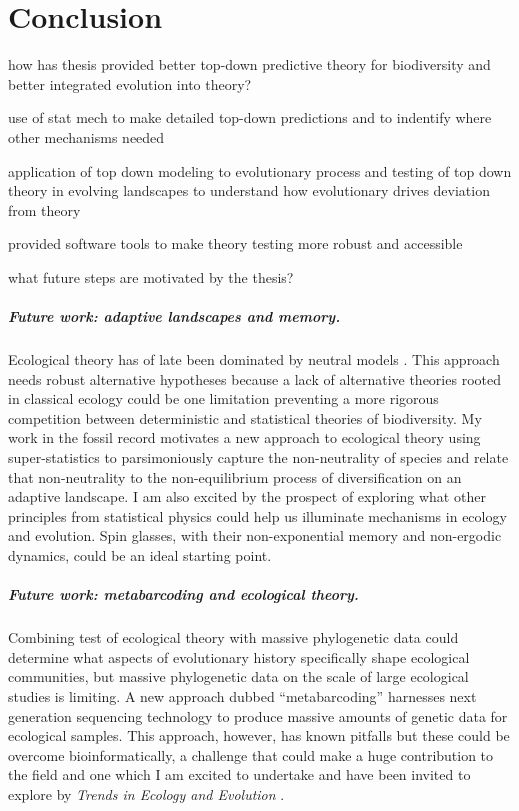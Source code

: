 \chapter*{Conclusion}

how has thesis provided better top-down predictive theory for
biodiversity and better integrated evolution into theory?

use of stat mech to make detailed top-down predictions and to
indentify where other mechanisms needed

application of top down modeling to evolutionary process and testing
of top down theory in evolving landscapes to understand how
evolutionary drives deviation from theory

provided software tools to make theory testing more robust and
accessible

what future steps are motivated by the thesis?

\paragraph{Future work: adaptive landscapes and memory.}
Ecological theory has of late been dominated by neutral models
\citep[e.g.][]{rominger2009, rominger2015GEB}. This approach needs
robust alternative hypotheses because a lack of alternative theories
rooted in classical ecology could be one limitation preventing a more
rigorous competition between deterministic and statistical theories of
biodiversity. My work in the fossil record motivates a new approach to
ecological theory using super-statistics to parsimoniously capture the
non-neutrality of species and relate that non-neutrality to the
non-equilibrium process of diversification on an adaptive landscape. I
am also excited by the prospect of exploring what other principles
from statistical physics could help us illuminate mechanisms in
ecology and evolution. Spin glasses, with their non-exponential memory
and non-ergodic dynamics, could be an ideal starting point.

\paragraph{Future work: metabarcoding and ecological theory.}
Combining test of ecological theory with massive phylogenetic data
could determine what aspects of evolutionary history specifically
shape ecological communities, but massive phylogenetic data on the
scale of large ecological studies is limiting.  A new approach
dubbed ``metabarcoding'' \citep{taberlet2012} harnesses next
generation sequencing technology to produce massive amounts of genetic
data for ecological samples. This approach, however, has known
pitfalls but these could be overcome bioinformatically, a challenge
that could make a huge contribution to the field and one which I am
excited to undertake and have been invited to explore by {\it Trends
  in Ecology and Evolution} \citep{romTREE}.